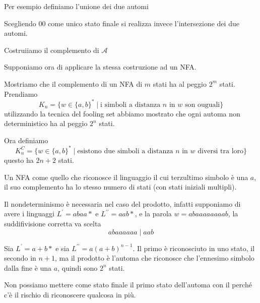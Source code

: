 \documentclass[12pt]{article}
\begin{document}
\begin{tcolorbox}
	Per esempio definiamo l'unione dei due automi 

	Scegliendo 00 come unico stato finale si realizza invece l'intersezione dei due automi.
\end{tcolorbox}

\begin{tcolorbox}
	Costruiiamo il complemento di $\mathcal{A}$
	 
	Supponiamo ora di applicare la stessa costruzione ad un NFA.
\end{tcolorbox}

\begin{tcolorbox}
	Mostriamo che il complemento di un NFA di $m$ stati ha al peggio $2^m$ stati.
	Prendiamo 
	$$ K_n = \{ w \in \{a, b\}^* \mid \text{i simboli a distanza $n$ in $w$ son ouguali} \} $$
	utilizzando la tecnica del fooling set abbiamo mostrato che ogni automa non deterministico ha al peggio $2^n$ stati.

	Ora definiamo
	$$ K_n^C = \{ w \in \{a, b\}^* \mid \text{esistono due simboli a distanza $n$ in $w$ diversi tra loro} \} $$
	questo ha $2n + 2$ stati.

	Un NFA come quello che riconosce il linguaggio il cui terzultimo simbolo è una $a$, il suo complemento ha lo stesso numero di stati (con stati iniziali multipli).
\end{tcolorbox}

\begin{tcolorbox}
	Il nondeterminismo è necessaria nel caso del prodotto, infatti supponiamo di avere i linguaggi $L^\prime = abaa*$ e $L^{\prime\prime} = aab*$, e la parola $w = abaaaaaaaab$, la suddifivisione corretta va scelta
	$$ abaaaaaa\mid aab$$
\end{tcolorbox}

\begin{tcolorbox}
	Sia $L^\prime = a + b*$ e sia $L^{\prime\prime} = a(a + b)^{n - 1}$.
	Il primo è riconosciuto in uno stato, il secondo in $n + 1$, ma il prodotto è l'automa che riconosce che l'ennesimo simbolo dalla fine è una $a$, quindi sono $2^n$ stati.
\end{tcolorbox}

\begin{tcolorbox}
	Non possiamo mettere come stato finale il primo stato dell'automa con il perché c'è il rischio di riconoscere qualcosa in più. 
	
\end{tcolorbox}
\end{document}
